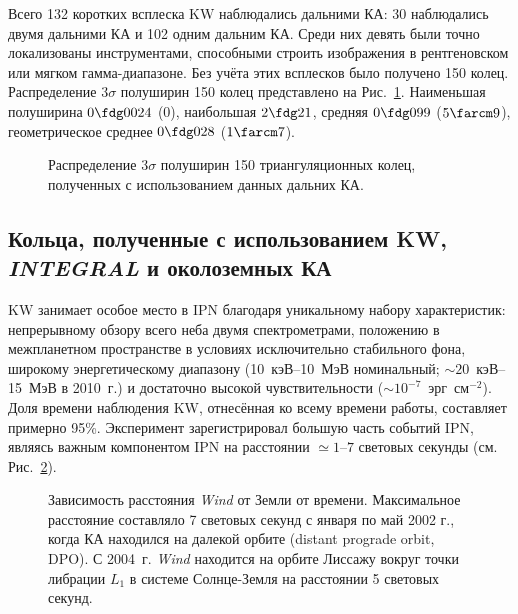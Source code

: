 Всего 132 коротких всплеска KW наблюдались дальними КА: 30 наблюдались 
двумя дальними КА и 102 одним дальним КА. Среди них девять были точно локализованы 
инструментами, способными строить изображения в рентгеновском или мягком гамма-диапазоне. 
Без учёта этих всплесков было получено 150 колец. Распределение $3\sigma$ полуширин 150 колец 
представлено на Рис.~\ref{img:dist_150}. Наименьшая полуширина $0\fdg0024$ (0), 
наибольшая $2\fdg21$, средняя $0\fdg099$ ($5\farcm9$), геометрическое 
среднее $0\fdg028$ ($1\farcm7$).

\begin{figure}[h]
    \caption[Распределение ширин колец, построенных с использованием дальних КА]
    {Распределение $3\sigma$ полуширин 150 триангуляционных колец, полученных с 
    использованием данных дальних КА.}
 \label{img:dist_150}  
\end{figure}
\FloatBarrier
\subsection{Кольца, полученные с использованием KW, \textit{INTEGRAL} и околоземных КА}
KW занимает особое место в IPN благодаря уникальному набору характеристик: 
непрерывному обзору всего неба двумя спектрометрами, положению в межпланетном 
пространстве в условиях исключительно стабильного фона, широкому энергетическому 
диапазону (10~кэВ--10~МэВ номинальный; $\sim 20$~кэВ--15~МэВ в 2010~г.) и достаточно 
высокой чувствительности ($\sim 10^{-7}$~эрг~см$^{-2}$). Доля времени наблюдения 
KW, отнесённая ко всему времени работы, составляет примерно 95\%. 
Эксперимент зарегистрировал большую часть событий IPN, являясь важным компонентом 
IPN на расстоянии $\simeq 1\textrm{--}7$ световых секунды (см. Рис.~\ref{img:Wind_distance}).

\begin{figure}[h]
    \caption[Расстояние \textit{Wind} от Земли]
    {Зависимость расстояния \textit{Wind} от Земли от времени.
     Максимальное расстояние составляло 7 световых секунд с января по май 2002 г., 
     когда КА находился на далекой орбите (distant prograde orbit, DPO).
     С 2004~г. \textit{Wind} находится на орбите Лиссажу вокруг точки либрации $L_1$
     в системе Солнце-Земля на расстоянии 5 световых секунд.}
 \label{img:Wind_distance}  
\end{figure}

